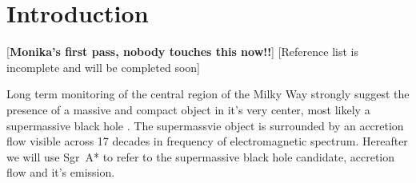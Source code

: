 \section{Introduction}\label{sec:intro}
\color{red}
[{\bf Monika's first pass, nobody touches this now!!}]
\color{green}
[Reference list is incomplete and will be completed soon]
\color{black}

Long term monitoring of the central region of the Milky Way strongly suggest the presence of a massive and compact object in it's very center, most likely a supermassive black hole \citep{2019A&A...625L..10G,2019Sci...365..664D}. The supermassvie object is surrounded by an accretion flow visible across 17 decades in frequency of electromagnetic spectrum. Hereafter we will use Sgr~A* to refer to the supermassive black hole candidate, accretion flow and it's emission. 

